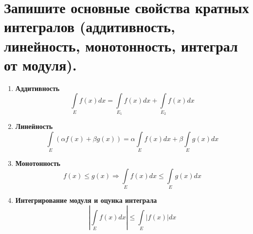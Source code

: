 \section{Запишите основные свойства кратных интегралов (аддитивность, линейность, монотонность, интеграл от модуля).}
\begin{enumerate}
    \item \textbf{Аддитивность} \newline
    \[
        \int \limits_{E} f(x) dx = \int \limits_{E_1} f(x) dx + \int \limits_{E_2} f(x) dx
    \]
    \item \textbf{Линейность} \newline
    \[
        \int \limits_{E} (\alpha f(x) + \beta g(x)) = \alpha \int \limits_{E} f(x) dx + \beta \int \limits_{E} g(x) dx
    \]
    \item \textbf{Монотонность} \newline
    \[
        f(x) \leqslant g(x) \Rightarrow
        \int \limits_{E} f(x) dx \leqslant \int \limits_{E} g(x) dx
    \]
    \item \textbf{Интегрирование модуля и оцунка интеграла} \newline
    \[
        \left|
            \int \limits_{E} f(x) dx
        \right|
        \leqslant
        \int \limits_{E} |f(x)| dx
    \]
\end{enumerate}